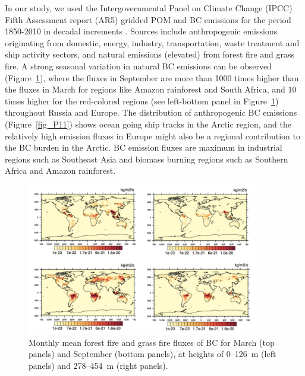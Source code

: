 \documentclass[12pt, fullpage]{uiucthesis2009_2}
\begin{document}
		In our study, we used the Intergovernmental Panel on Climate Change (IPCC) Fifth Assessment report (AR5) gridded POM and BC emissions for the period 1850-2010 in decadal increments \citep{Lamarque2010}. Sources include anthropogenic emissions originating from domestic, energy, industry, transportation, waste treatment and ship activity sectors, and natural emissions (elevated) from forest fire and grass fire. A strong seasonal variation in natural BC emissions can be observed (Figure~\ref{fig_P12}), where the fluxes in September are more than 1000 times higher than the fluxes in March for regions like Amazon rainforest and South Africa, and 10 times higher for the red-colored regions (see left-bottom panel in Figure~\ref{fig_P12}) throughout Russia and Europe. The distribution of anthropogenic BC emissions (Figure~\ref{fig_P11}) shows ocean going ship tracks in the Arctic region, and the relatively high emission fluxes in Europe might also be a regional contribution to the BC burden in the Arctic. BC emission fluxes are maximum in industrial regions such as Southeast Asia and biomass burning regions such as Southern Africa and Amazon rainforest. 
		
		\begin{figure}[h] 
			\begin{center}
				\includegraphics[width = 0.9\textwidth]{Figure12}
				\caption[Monthly mean forest fire and grass fire fluxes of BC for March (top panels) and September (bottom panels), at heights of 0--126~m (left panels) and 278--454~m (right panles)]{\label{fig_P12} Monthly mean forest fire and grass fire fluxes of BC for March (top panels) and September (bottom panels), at heights of 0--126~m (left panels) and 278--454~m (right panels).}
			\end{center}
		\end{figure}
		
\end{document}
